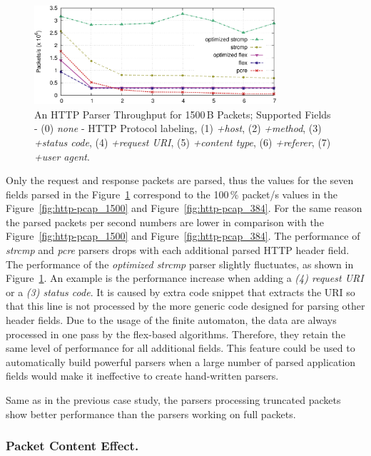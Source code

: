 \begin{figure}[tb]
    \centering
    \includegraphics[width=0.8\textwidth]{figures/paper-http/mod_1500}
    \caption{An HTTP Parser Throughput for 1500\,B Packets; Supported Fields - (0) \emph{none} - HTTP Protocol labeling, (1) \emph{+host}, (2) \emph{+method}, (3) \emph{+status code}, (4) \emph{+request URI}, (5) \emph{+content type}, (6) \emph{+referer}, (7) \emph{+user agent}.} 
    \label{fig:http-field}
\end{figure}


Only the request and response packets are parsed, thus the values for the seven fields parsed in the Figure~\ref{fig:http-field} correspond to the 100\,\% packet/s values in the Figure~\ref{fig:http-pcap_1500} and Figure~\ref{fig:http-pcap_384}. For the same reason the parsed packets per second numbers are lower in comparison with the Figure~\ref{fig:http-pcap_1500} and Figure~\ref{fig:http-pcap_384}. The performance of \emph{strcmp} and \emph{pcre} parsers drops with each additional parsed HTTP header field. The performance of the \emph{optimized strcmp} parser slightly fluctuates, as shown in Figure~\ref{fig:http-field}. An example is the performance increase when adding a \emph{(4) request URI} or a \emph{(3) status code}. It is caused by extra code snippet that extracts the URI so that this line is not processed by the more generic code designed for parsing other header fields. Due to the usage of the finite automaton, the data are always processed in one pass by the flex-based algorithms. Therefore, they retain the same level of performance for all additional fields. This feature could be used to automatically build powerful parsers when a large number of parsed application fields would make it ineffective to create hand-written parsers.

Same as in the previous case study, the parsers processing truncated packets show better performance than the parsers working on full packets.

\subsubsection*{Packet Content Effect.}

